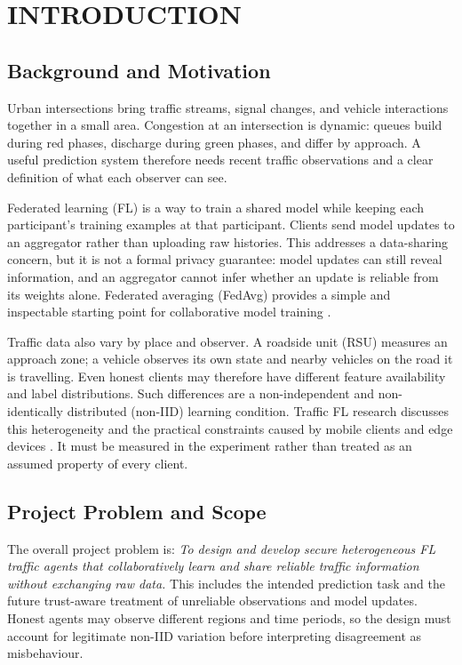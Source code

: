 \chapter{INTRODUCTION}\label{ch:intro}

\section{Background and Motivation}
Urban intersections bring traffic streams, signal changes, and vehicle interactions together in a small area. Congestion at an intersection is dynamic: queues build during red phases, discharge during green phases, and differ by approach. A useful prediction system therefore needs recent traffic observations and a clear definition of what each observer can see.

Federated learning (FL) is a way to train a shared model while keeping each participant's training examples at that participant. Clients send model updates to an aggregator rather than uploading raw histories. This addresses a data-sharing concern, but it is not a formal privacy guarantee: model updates can still reveal information, and an aggregator cannot infer whether an update is reliable from its weights alone. Federated averaging (FedAvg) provides a simple and inspectable starting point for collaborative model training \cite{mcmahan2017}.

Traffic data also vary by place and observer. A roadside unit (RSU) measures an approach zone; a vehicle observes its own state and nearby vehicles on the road it is travelling. Even honest clients may therefore have different feature availability and label distributions. Such differences are a non-independent and non-identically distributed (non-IID) learning condition. Traffic FL research discusses this heterogeneity and the practical constraints caused by mobile clients and edge devices \cite{chellapandi2023,zhang2024}. It must be measured in the experiment rather than treated as an assumed property of every client.

\section{Project Problem and Scope}
The overall project problem is: \emph{To design and develop secure heterogeneous FL traffic agents that collaboratively learn and share reliable traffic information without exchanging raw data.} This includes the intended prediction task and the future trust-aware treatment of unreliable observations and model updates. Honest agents may observe different regions and time periods, so the design must account for legitimate non-IID variation before interpreting disagreement as misbehaviour.

